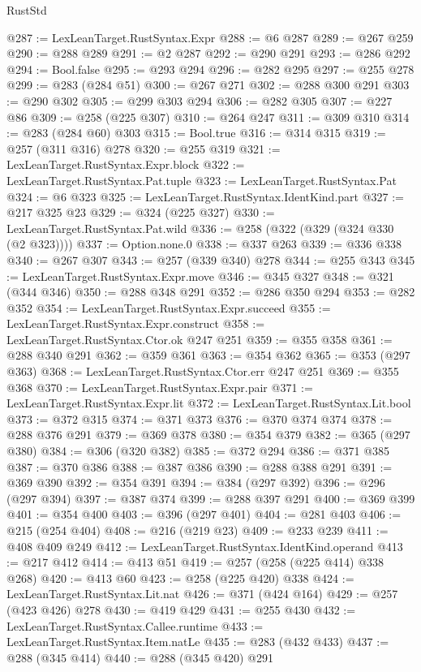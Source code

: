 \begin{lexlean}{RustStd}
\begin{coremodule}
{\begin{coremodule}
{{{{{{{{{@287 := LexLeanTarget.RustSyntax.Expr
@288 := @6 @287
@289 := @267 @259
@290 := @288 @289
@291 := @2 @287
@292 := @290 @291
@293 := @286 @292
@294 := Bool.false
@295 := @293 @294
@296 := @282 @295
@297 := @255 @278
@299 := @283 (@284 @51)
@300 := @267 @271
@302 := @288 @300 @291
@303 := @290 @302
@305 := @299 @303 @294
@306 := @282 @305
@307 := @227 @86
@309 := @258 (@225 @307)
@310 := @264 @247
@311 := @309 @310
@314 := @283 (@284 @60) @303
@315 := Bool.true
@316 := @314 @315
@319 := @257 (@311 @316) @278
@320 := @255 @319
@321 := LexLeanTarget.RustSyntax.Expr.block
@322 := LexLeanTarget.RustSyntax.Pat.tuple
@323 := LexLeanTarget.RustSyntax.Pat
@324 := @6 @323
@325 := LexLeanTarget.RustSyntax.IdentKind.part
@327 := @217 @325 @23
@329 := @324 (@225 @327)
@330 := LexLeanTarget.RustSyntax.Pat.wild
@336 := @258 (@322 (@329 (@324 @330 (@2 @323))))
@337 := Option.none.{0}
@338 := @337 @263
@339 := @336 @338
@340 := @267 @307
@343 := @257 (@339 @340) @278
@344 := @255 @343
@345 := LexLeanTarget.RustSyntax.Expr.move
@346 := @345 @327
@348 := @321 (@344 @346)
@350 := @288 @348 @291
@352 := @286 @350 @294
@353 := @282 @352
@354 := LexLeanTarget.RustSyntax.Expr.succeed
@355 := LexLeanTarget.RustSyntax.Expr.construct
@358 := LexLeanTarget.RustSyntax.Ctor.ok @247 @251
@359 := @355 @358
@361 := @288 @340 @291
@362 := @359 @361
@363 := @354 @362
@365 := @353 (@297 @363)
@368 := LexLeanTarget.RustSyntax.Ctor.err @247 @251
@369 := @355 @368
@370 := LexLeanTarget.RustSyntax.Expr.pair
@371 := LexLeanTarget.RustSyntax.Expr.lit
@372 := LexLeanTarget.RustSyntax.Lit.bool
@373 := @372 @315
@374 := @371 @373
@376 := @370 @374 @374
@378 := @288 @376 @291
@379 := @369 @378
@380 := @354 @379
@382 := @365 (@297 @380)
@384 := @306 (@320 @382)
@385 := @372 @294
@386 := @371 @385
@387 := @370 @386
@388 := @387 @386
@390 := @288 @388 @291
@391 := @369 @390
@392 := @354 @391
@394 := @384 (@297 @392)
@396 := @296 (@297 @394)
@397 := @387 @374
@399 := @288 @397 @291
@400 := @369 @399
@401 := @354 @400
@403 := @396 (@297 @401)
@404 := @281 @403
@406 := @215 (@254 @404)
@408 := @216 (@219 @23)
@409 := @233 @239
@411 := @408 @409 @249
@412 := LexLeanTarget.RustSyntax.IdentKind.operand
@413 := @217 @412
@414 := @413 @51
@419 := @257 (@258 (@225 @414) @338 @268)
@420 := @413 @60
@423 := @258 (@225 @420) @338
@424 := LexLeanTarget.RustSyntax.Lit.nat
@426 := @371 (@424 @164)
@429 := @257 (@423 @426) @278
@430 := @419 @429
@431 := @255 @430
@432 := LexLeanTarget.RustSyntax.Callee.runtime
@433 := LexLeanTarget.RustSyntax.Item.natLe
@435 := @283 (@432 @433)
@437 := @288 (@345 @414)
@440 := @288 (@345 @420) @291
}}}}}}}}}
\end{coremodule}}
\end{coremodule}
\end{lexlean}
